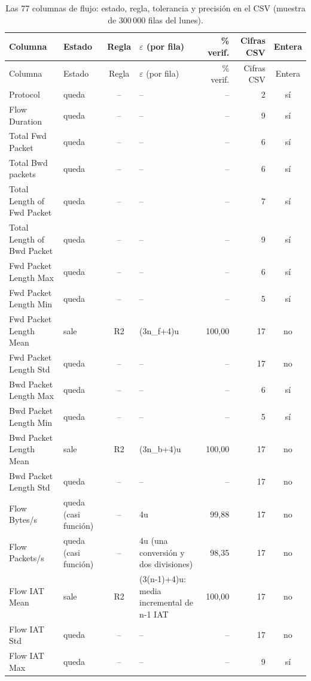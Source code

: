 \begin{longtable}{@{}>{\raggedright\arraybackslash}p{3.6cm}>{\raggedright\arraybackslash}p{2.3cm}c>{\raggedright\arraybackslash}p{3.6cm}rrc@{}}
\caption{Las 77 columnas de flujo: estado, regla, tolerancia y precisión en el CSV (muestra de 300\,000 filas del lunes).}\label{tab:77}\\
\toprule
Columna & Estado & Regla & $\varepsilon$ (por fila) & \% verif. & Cifras CSV & Entera \\
\midrule
\endfirsthead
\toprule
Columna & Estado & Regla & $\varepsilon$ (por fila) & \% verif. & Cifras CSV & Entera \\
\midrule
\endhead
Protocol & queda & -- & -- & -- & 2 & sí \\
Flow Duration & queda & -- & -- & -- & 9 & sí \\
Total Fwd Packet & queda & -- & -- & -- & 6 & sí \\
Total Bwd packets & queda & -- & -- & -- & 6 & sí \\
Total Length of Fwd Packet & queda & -- & -- & -- & 7 & sí \\
Total Length of Bwd Packet & queda & -- & -- & -- & 9 & sí \\
Fwd Packet Length Max & queda & -- & -- & -- & 6 & sí \\
Fwd Packet Length Min & queda & -- & -- & -- & 5 & sí \\
Fwd Packet Length Mean & sale & R2 & (3n\_f+4)u & 100{,}00 & 17 & no \\
Fwd Packet Length Std & queda & -- & -- & -- & 17 & no \\
Bwd Packet Length Max & queda & -- & -- & -- & 6 & sí \\
Bwd Packet Length Min & queda & -- & -- & -- & 5 & sí \\
Bwd Packet Length Mean & sale & R2 & (3n\_b+4)u & 100{,}00 & 17 & no \\
Bwd Packet Length Std & queda & -- & -- & -- & 17 & no \\
Flow Bytes/s & queda (casi función) & -- & 4u & 99{,}88 & 17 & no \\
Flow Packets/s & queda (casi función) & -- & 4u (una conversión y dos divisiones) & 98{,}35 & 17 & no \\
Flow IAT Mean & sale & R2 & (3(n-1)+4)u: media incremental de n-1 IAT & 100{,}00 & 17 & no \\
Flow IAT Std & queda & -- & -- & -- & 17 & no \\
Flow IAT Max & queda & -- & -- & -- & 9 & sí \\

\end{longtable}

